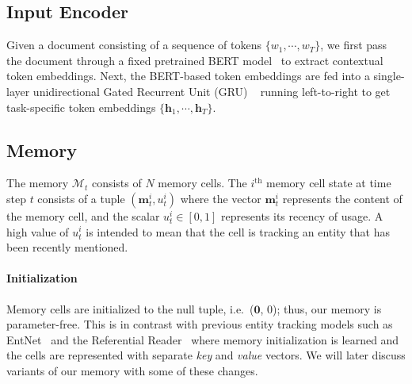 \documentclass[11pt,a4paper]{article}
\def\vec#1{\ensuremath{\boldsymbol{{#1}}}}
\begin{document}
\subsection{Input Encoder}
\label{sec:input_encoder}
Given a document consisting of a sequence of tokens $\{w_1, \cdots, w_T\}$, we first pass the document through a fixed pretrained BERT model~\cite{devlin2019bert} to extract contextual token embeddings.
 Next, the BERT-based token embeddings are fed into a single-layer unidirectional Gated Recurrent Unit (GRU) ~\cite{cho2014learning} running left-to-right to get task-specific token embeddings $\{\vec{h}_1, \cdots, \vec{h}_T\}$.

\subsection{Memory}
The memory $\mathcal{M}_t$ consists of $N$ memory cells. The $i^{\textrm{th}}$ memory cell state at time step $t$ consists of a tuple $(\vec{m}^i_t, u^i_t)$
where the vector $\vec{m}^i_t$ represents the content of the memory cell, and the scalar $u^i_t \in [0, 1]$ represents
its recency of usage. A high value of $u^i_t$ is intended to mean that the cell is tracking an entity that has been recently mentioned. 

\paragraph{Initialization}
Memory cells are initialized to the null tuple, i.e.\ (\vec{0}, 0); thus, our memory is parameter-free. This is in contrast with previous entity tracking models such as EntNet~\cite{henaff2016tracking} and the Referential Reader~\cite{liu2019referential} where memory initialization is learned and the cells are represented with separate {\it key} and {\it value} vectors.
We will later discuss variants of our memory with some of these changes.
\end{document}
